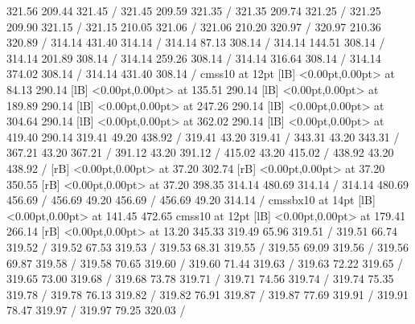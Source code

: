 { 321.56 209.44 321.45 /
 321.45 209.59 321.35 /
 321.35 209.74 321.25 /
 321.25 209.90 321.15 /
 321.15 210.05 321.06 /
 321.06 210.20 320.97 /
 320.97 210.36 320.89 /
\setsolid
{} 314.14 431.40 314.14 /
\setsolid
{} 314.14 87.13 308.14 /
\setsolid
{} 314.14 144.51 308.14 /
\setsolid
{} 314.14 201.89 308.14 /
\setsolid
{} 314.14 259.26 308.14 /
\setsolid
{} 314.14 316.64 308.14 /
\setsolid
{} 314.14 374.02 308.14 /
\setsolid
{} 314.14 431.40 308.14 /
\font\picfont cmss10 at 12pt\picfont
{}  [lB] <0.00pt,0.00pt> at 84.13 290.14
  [lB] <0.00pt,0.00pt> at 135.51 290.14
  [lB] <0.00pt,0.00pt> at 189.89 290.14
  [lB] <0.00pt,0.00pt> at 247.26 290.14
  [lB] <0.00pt,0.00pt> at 304.64 290.14
  [lB] <0.00pt,0.00pt> at 362.02 290.14
  [lB] <0.00pt,0.00pt> at 419.40 290.14
\setsolid
{} 319.41 49.20 438.92 /
\setsolid
{} 319.41 43.20 319.41 /
\setsolid
{} 343.31 43.20 343.31 /
\setsolid
{} 367.21 43.20 367.21 /
\setsolid
{} 391.12 43.20 391.12 /
\setsolid
{} 415.02 43.20 415.02 /
\setsolid
{} 438.92 43.20 438.92 /
 [rB] <0.00pt,0.00pt> at 37.20 302.74
 [rB] <0.00pt,0.00pt> at 37.20 350.55
 [rB] <0.00pt,0.00pt> at 37.20 398.35
\setsolid
{} 314.14 480.69 314.14 /
 314.14 480.69 456.69 /
 456.69 49.20 456.69 /
 456.69 49.20 314.14 /
\font\picfont cmssbx10 at 14pt\picfont
{}  [lB] <0.00pt,0.00pt> at 141.45 472.65
\font\picfont cmss10 at 12pt\picfont
{}  [lB] <0.00pt,0.00pt> at 179.41 266.14
 [rB] <0.00pt,0.00pt> at 13.20 345.33
\setsolid
{} 319.49 65.96 319.51 /
 319.51 66.74 319.52 /
 319.52 67.53 319.53 /
 319.53 68.31 319.55 /
 319.55 69.09 319.56 /
 319.56 69.87 319.58 /
 319.58 70.65 319.60 /
 319.60 71.44 319.63 /
 319.63 72.22 319.65 /
 319.65 73.00 319.68 /
 319.68 73.78 319.71 /
 319.71 74.56 319.74 /
 319.74 75.35 319.78 /
 319.78 76.13 319.82 /
 319.82 76.91 319.87 /
 319.87 77.69 319.91 /
 319.91 78.47 319.97 /
 319.97 79.25 320.03 /
}
